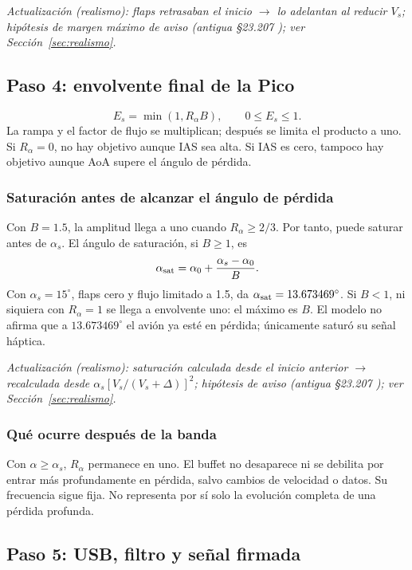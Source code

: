 \textit{Actualización (realismo): flaps retrasaban el inicio $\rightarrow$ lo adelantan al reducir $V_s$; hipótesis de margen máximo de aviso (antigua §23.207 \cite{cfr23}); ver Sección~\ref{sec:realismo}.}

\subsection{Paso 4: envolvente final de la Pico}
\begin{equation}
E_s=\min(1,R_\alpha B),\qquad 0\le E_s\le1.
\label{eq:stall-envelope}
\end{equation}
La rampa y el factor de flujo se multiplican; después se limita el producto a uno. Si $R_\alpha=0$, no hay objetivo aunque IAS sea alta. Si IAS es cero, tampoco hay objetivo aunque AoA supere el ángulo de pérdida.

\subsubsection{Saturación antes de alcanzar el ángulo de pérdida}
Con $B=1.5$, la amplitud llega a uno cuando $R_\alpha\ge2/3$. Por tanto, puede saturar antes de $\alpha_s$. El ángulo de saturación, si $B\ge1$, es
\begin{equation}
\alpha_{\rm sat}=\alpha_0+\frac{\alpha_s-\alpha_0}{B}.
\end{equation}
Con $\alpha_s=15^\circ$, flaps cero y flujo limitado a 1.5, da $\alpha_{\rm sat}=13.673469^\circ$. Si $B<1$, ni siquiera con $R_\alpha=1$ se llega a envolvente uno: el máximo es $B$. El modelo no afirma que a $13.673469^\circ$ el avión ya esté en pérdida; únicamente saturó su señal háptica.

\textit{Actualización (realismo): saturación calculada desde el inicio anterior $\rightarrow$ recalculada desde $\alpha_s[V_s/(V_s+\Delta)]^2$; hipótesis de aviso (antigua §23.207 \cite{cfr23}); ver Sección~\ref{sec:realismo}.}

\subsubsection{Qué ocurre después de la banda}
Con $\alpha\ge\alpha_s$, $R_\alpha$ permanece en uno. El buffet no desaparece ni se debilita por entrar más profundamente en pérdida, salvo cambios de velocidad o datos. Su frecuencia sigue fija. No representa por sí solo la evolución completa de una pérdida profunda.

\subsection{Paso 5: USB, filtro y señal firmada}
